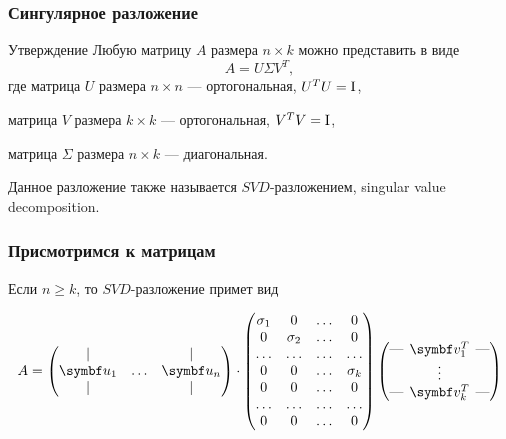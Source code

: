 \begin{frame}
  \frametitle{Сингулярное разложение}

  \begin{block}{Утверждение}
    Любую матрицу $A$ размера $n\times k$ можно представить в виде
    \[
    A = U \Sigma V^T,  
    \]
    где матрица $U$ размера $n\times n$ — ортогональная, $U^TU=\mathrm{I}$,

    матрица $V$ размера $k\times k$ — ортогональная, $V^TV=\mathrm{I}$,

    матрица $\Sigma$ размера $n\times k$ — диагональная.
    
  \end{block} \pause

  Данное разложение также называется \alert{$SVD$-разложением}, singular value decomposition.

\end{frame}
  



\begin{frame}
  \frametitle{Присмотримся к матрицам}

  Если $n\geq k$, то $SVD$-разложение примет вид

  \[
  A = \begin{pmatrix}
    \vert &  & \vert \\
    \bu_1 & \ldots & \bu_n \\
    \vert &    & \vert \\
  \end{pmatrix} \cdot 
  \begin{pmatrix}
    \sigma_1 & 0 & \ldots & 0 \\
     0 & \sigma_2 & \ldots & 0 \\
    \ldots & \ldots & \ldots & \ldots \\
0 & 0 & \ldots & \sigma_k \\
0 & 0 & \ldots & 0 \\
\ldots & \ldots & \ldots & \ldots \\
0 & 0 & \ldots & 0 \\
  \end{pmatrix} \begin{pmatrix}
\text{—}  \hspace{-0.2cm} & \bv_1^T & \hspace{-0.2cm}  \text{—} \\
 & \vdots &  \\
\text{—}  \hspace{-0.2cm} & \bv_k^T & \hspace{-0.2cm}  \text{—} \\
   \end{pmatrix}
  \]
  
\end{frame}


